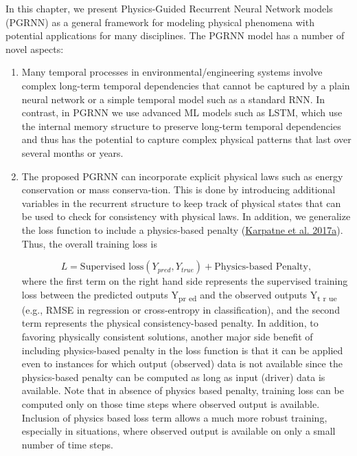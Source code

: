 \documentclass[book.tex]{subfiles}
\begin{document}
In this chapter, we present Physics-Guided Recurrent Neural Network models
(PGRNN) as a general framework for modeling physical phenomena with
potential applications for many disciplines. The PGRNN model has a number
of novel aspects:


\begin{enumerate}
\def\labelenumi{\arabic{enumi}.}
\item
  
  Many temporal processes in environmental/engineering systems involve
  complex long-term temporal dependencies that cannot be captured by a
  plain neural network or a simple temporal model such as a standard
  RNN. In contrast, in PGRNN we use advanced ML models such as LSTM,
  which use the internal memory structure to preserve long-term temporal
  dependencies and thus has the potential to capture complex physical
  patterns that last over several months or years.
  
\item
  
  The proposed PGRNN can incorporate explicit physical laws such as
  energy conservation or mass conserva-tion. This is done by introducing
  additional variables in the recurrent structure to keep track of
  physical states that can be used to check for consistency with
  physical laws. In addition, we generalize the loss function to include
  a physics-based penalty (\protect\hyperlink{page23}{Karpatne et al.
  2017a}). Thus, the overall training loss is 
  
\[ L = \textrm{Supervised loss} (Y_{pred},Y_{true}) +
  \textrm{Physics-based Penalty}, \] 
  where the first term on the right hand
  side represents the supervised training loss between the predicted
  outputs Y\textsubscript{pr ed} and the observed outputs
  Y\textsubscript{t r ue} (e.g., RMSE in regression or cross-entropy in
  classification), and the second term represents the physical
  consistency-based penalty. In addition, to favoring physically
  consistent solutions, another major side benefit of including
  physics-based penalty in the loss function is that it can be applied
  even to instances for which output (observed) data is not available
  since the physics-based penalty can be computed as long as input
  (driver) data is available. Note that in absence of physics based
  penalty, training loss can be computed only on those time steps where
  observed output is available. Inclusion of physics based loss term
  allows a much more robust training, especially in situations, where
  observed output is available on only a small number of time steps.
  

\end{enumerate}
\end{document}
